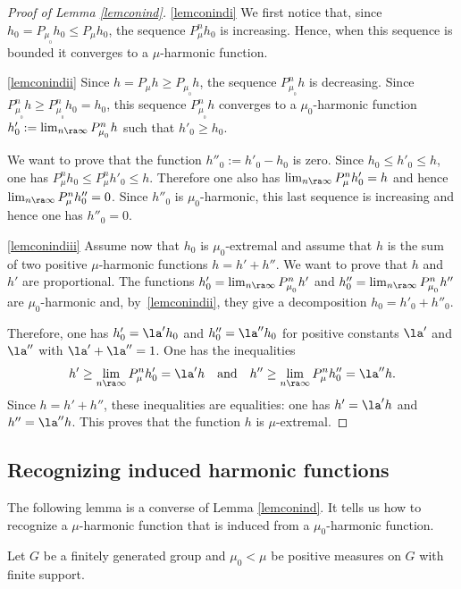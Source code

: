 \skpt
\begin{proof}[Proof of Lemma \ref{lemconind}]

\eqref{lemconindi}
We first notice that, since $h_0=P_{\mu_{_0}}h_0\leq P_\mu h_0$,
the sequence $P^n_\mu h_0$ is increasing.
Hence, when this sequence is bounded it converges to a $\mu$-harmonic function.

\eqref{lemconindii}
Since $h\!=\!P_{\mu}h\!\geq\!P_{\mu_{_0}} h$,
the sequence $P^n_{\mu_{_0}} h$ is decreasing.
Since \hbox{$P_{\mu_{_0}}^n h\!\geq\!P_{\mu_{_0}}^n h_0\!=\!h_0$}, this sequence $P^n_{\mu_{_0}} h$
converges to a $\mu_0$-harmonic function
$h'_0:=\lim_{n\ra\infty}P^n_{\mu_{_0}}h$ such that
$h'_0\geq h_0$.

We want to prove that the function $h''_0:= h'_0-h_0$ is zero.
Since $h_0\leq h'_0\leq h$, one has
$P^n_\mu h_0\leq P^n_\mu h'_0\leq h$.
Therefore one also has
$\lim_{n\ra\infty}P^n_{\mu}h'_0=h$
and hence
$\lim_{n\ra\infty}P^n_{\mu}h''_0=0$.
Since $h''_0$ is $\mu_0$-harmonic, this last sequence is increasing
and hence one has $h''_0=0$.

\eqref{lemconindiii}
Assume now that $h_0$ is $\mu_0$-extremal and assume that
$h$ is the sum of two positive $\mu$-harmonic functions
$h=h'+h''$. We want to prove that $h$ and $h'$ are proportional.
The functions
$h'_0=\lim_{n\ra\infty}P^n_{\mu_{_0}}h'$
and
$h''_0=\lim_{n\ra\infty}P^n_{\mu_{_0}}h''$
are $\mu_0$-harmonic and, by~\eqref{lemconindii}, they give a decomposition
$h_0=h'_0+h''_0$.

Therefore,
one has $h'_0=\la' h_0$ and $h''_0=\la'' h_0$
for positive constants $\la'$ and $\la''$ with $\la'+\la''=1$.
One has the inequalities
\[
h'\geq\lim_{n\ra\infty}P^n_{\mu}h'_0 =\la' h\quad\text{and}
\quad h''\geq\lim_{n\ra\infty}P^n_{\mu}h''_0 =\la'' h.
\]
Since $h=h'+h''$, these inequalities are equalities: one has
$h'=\la' h$ and $h''=\la'' h$.
This proves that the function $h$ is $\mu$-extremal.
\end{proof}

\subsection{Recognizing induced harmonic functions}
\label{secrecind}

\bq
The following lemma is a converse of Lemma \ref{lemconind}.
It tells us how to recognize
a $\mu$-harmonic function that is induced from a $\mu_0$-harmonic function.
\eq

Let $G$ be a finitely generated group and
$\mu_0<\mu$ be positive measures on $G$ with finite support.

